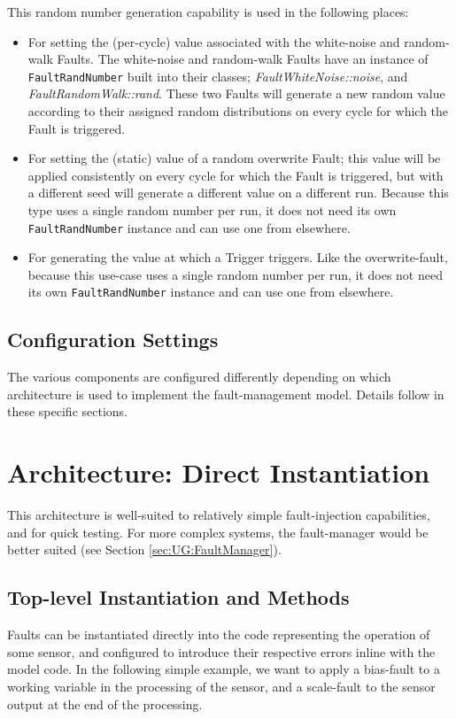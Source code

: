 \documentclass[11pt,fleqn]{report}
\begin{document}
This random number generation capability is used in the following places:
\begin{itemize}
\item For setting the (per-cycle) value associated with the white-noise and
      random-walk Faults. The white-noise and random-walk Faults have an
      instance of \verb'FaultRandNumber' built into their classes;
      \textit{FaultWhiteNoise::noise}, and \textit{FaultRandomWalk::rand}.
      These two Faults will
      generate a new random value according to their assigned random
      distributions on every cycle for which the Fault is triggered.
\item For setting the (static) value of a random overwrite Fault;
      this value will be applied consistently on every cycle for which the
      Fault is triggered, but with a different seed will generate a different
      value on a different run. Because this type uses a single random number
      per run, it does not need its own \verb'FaultRandNumber' instance and
      can use one from elsewhere.
\item For generating the value at which a Trigger triggers.
      Like the overwrite-fault, because this use-case uses a single random
      number per run, it does not need its own \verb'FaultRandNumber'
      instance and can use one from elsewhere.
\end{itemize}





\subsection{Configuration Settings}
The various components are configured differently depending on which
architecture is used to implement the fault-management model. Details follow in
these specific sections.





\section{Architecture: Direct Instantiation} \label{sec:UG:DirectInstantiation}
This architecture is well-suited to relatively simple fault-injection
capabilities, and for quick testing. For more complex systems, the fault-manager
would be better suited (see Section \ref{sec:UG:FaultManager}).

\subsection{Top-level Instantiation and Methods}
Faults can be instantiated directly into the code representing the operation of
some sensor, and configured to introduce their respective errors inline with the
model code. In the following simple example,
we want to apply a bias-fault to a working variable in the processing of
the sensor, and a scale-fault to the sensor output at the end of the
processing.
\end{document}
